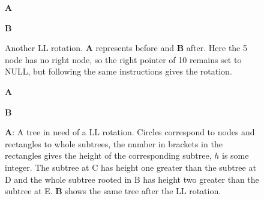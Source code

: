 \documentclass[11pt,a4paper]{scrartcl}
\begin{document}
\begin{figure}
\textbf{A}
\begin{center}
\end{center}
\textbf{B}
\begin{center}
\end{center}
\caption{Another LL rotation. \textbf{A} represents before and \textbf{B}
  after. Here the 5 node has no right node, so the right pointer of 10
  remains set to NULL, but following the same instructions gives the rotation.\label{fig_LL_simple}}
\end{figure}

\begin{figure}
\textbf{A}
\begin{center}
\end{center}
\textbf{B}
\begin{center}
\end{center}
\caption{\textbf{A}: A tree in need of a LL rotation. Circles
  correspond to nodes and rectangles to whole subtrees, the number in
  brackets in the rectangles gives the height of the corresponding
  subtree, $h$ is some integer. The subtree at C has height one
  greater than the subtree at D and the whole subtree rooted in B has
  height two greater than the subtree at E. \textbf{B} shows the same
  tree after the LL rotation.\label{fig_LL_complicated}}
\end{figure}
\end{document}
